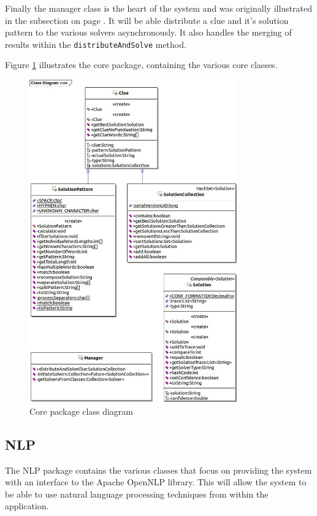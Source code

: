 Finally the manager class is the heart of the system and was originally 
illustrated in the subsection  on page 
\pageref{sub:solving_a_clue}. It will be able distribute a clue and it's 
solution pattern to the various solvers asynchronously. It also handles the 
merging of results within the \texttt{distributeAndSolve} method.

Figure \ref{fig:core_package} illustrates the core package, containing the 
various core classes.

\begin{figure}[H]
  \centering
  \includegraphics[width=0.8\textwidth]{class/core.jpg}
  \caption{Core package class diagram}
  \label{fig:core_package}
\end{figure}


\subsection{NLP}
\label{sub:nlp}

The NLP package contains the various classes that focus on providing the system 
with an interface to the Apache OpenNLP library. This will allow the system to 
be able to use natural language processing techniques from within the 
application.

